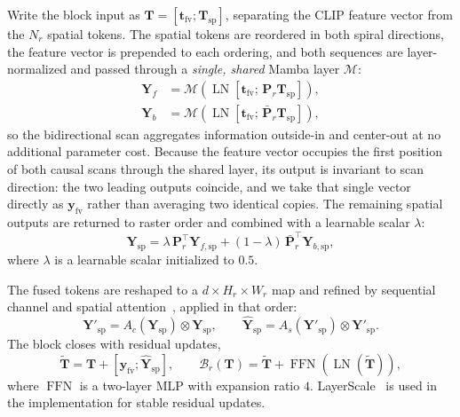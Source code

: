\documentclass[runningheads]{llncs}
\begin{document}
Write the block input as $\mathbf{T}=[\mathbf{t}_{\mathrm{fv}};\mathbf{T}_{\mathrm{sp}}]$, separating the CLIP feature vector from the $N_r$ spatial tokens. The spatial tokens are reordered in both spiral directions, the feature vector is prepended to each ordering, and both sequences are layer-normalized and passed through a \emph{single, shared} Mamba layer $\mathcal{M}$:
\begin{align}
  \mathbf{Y}_{f} &= \mathcal{M}\!\left(\operatorname{LN}\!\left[\mathbf{t}_{\mathrm{fv}};\,\mathbf{P}_r\mathbf{T}_{\mathrm{sp}}\right]\right),
  \nonumber \\
  \mathbf{Y}_{b} &= \mathcal{M}\!\left(\operatorname{LN}\!\left[\mathbf{t}_{\mathrm{fv}};\,\bar{\mathbf{P}}_r\mathbf{T}_{\mathrm{sp}}\right]\right),
  \label{eq:spiral-mamba}
\end{align}
so the bidirectional scan aggregates information outside-in and center-out at no additional parameter cost. Because the feature vector occupies the first position of both causal scans through the shared layer, its output is invariant to scan direction: the two leading outputs coincide, and we take that single vector directly as $\mathbf{y}_{\mathrm{fv}}$ rather than averaging two identical copies. The remaining spatial outputs are returned to raster order and combined with a learnable scalar $\lambda$:
\begin{equation}
  \mathbf{Y}_{\mathrm{sp}}
  =
  \lambda\,\mathbf{P}_r^{\top}\mathbf{Y}_{f,\mathrm{sp}}
  +
  (1-\lambda)\,\bar{\mathbf{P}}_r^{\top}\mathbf{Y}_{b,\mathrm{sp}},
  \label{eq:direction-fusion}
\end{equation}
where $\lambda$ is a learnable scalar initialized to $0.5$.

The fused tokens are reshaped to a $d\times H_r\times W_r$ map and refined by sequential channel and spatial attention~\cite{woo2018cbam}, applied in that order:
\begin{equation}
  \mathbf{Y}'_{\mathrm{sp}} = A_c(\mathbf{Y}_{\mathrm{sp}})\otimes\mathbf{Y}_{\mathrm{sp}},
  \qquad
  \widehat{\mathbf{Y}}_{\mathrm{sp}} = A_s(\mathbf{Y}'_{\mathrm{sp}})\otimes\mathbf{Y}'_{\mathrm{sp}}.
  \label{eq:attention}
\end{equation}
The block closes with residual updates,
\begin{equation}
  \widetilde{\mathbf{T}} = \mathbf{T} + [\mathbf{y}_{\mathrm{fv}};\widehat{\mathbf{Y}}_{\mathrm{sp}}],
  \qquad
  \mathcal{B}_r(\mathbf{T}) = \widetilde{\mathbf{T}} + \operatorname{FFN}(\operatorname{LN}(\widetilde{\mathbf{T}})),
  \label{eq:block-update}
\end{equation}
where $\operatorname{FFN}$ is a two-layer MLP with expansion ratio $4$. LayerScale~\cite{touvron2021cait} is used in the implementation for stable residual updates.
\end{document}
